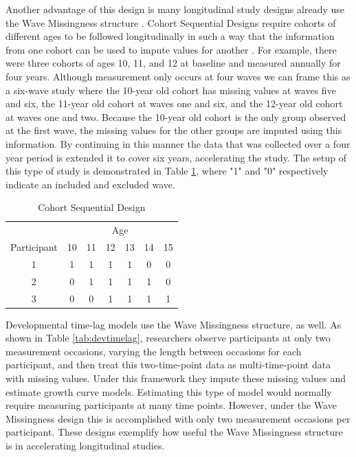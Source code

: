 \documentclass{svjour3}\usepackage[]{graphicx}\usepackage[]{color}
\begin{document}
Another advantage of this design is many longitudinal study designs already use the Wave Missingness structure \citep{little2013planned}. Cohort Sequential Designs require cohorts of different ages to be followed longitudinally in such a way that the information from one cohort can be used to impute values for another \citep{little2013longitudinal, duncan2013introduction}. For example, there were three cohorts of ages 10, 11, and 12 at baseline and measured annually for four years. Although measurement only occurs at four waves we can frame this as a six-wave study where the 10-year old cohort has missing values at waves five and six, the 11-year old cohort at waves one and six, and the 12-year old cohort at waves one and two. Because the 10-year old cohort is the only group observed at the first wave, the missing values for the other groups are imputed using this information. By continuing in this manner the data that was collected over a four year period is extended it to cover six years, accelerating the study. The setup of this type of study is demonstrated in Table \ref{tab:cohort}, where "1" and "0" respectively indicate an included and excluded wave. \par

\begin{table}[H]
	\centering
	\caption{Cohort Sequential Design}
	\label{tab:cohort}
	\setlength{\tabcolsep}{0.5cm}
	\begin{tabular}{c|cccccc}
		\toprule
		& \multicolumn{6}{c}{Age} \\
		Participant & 10 & 11 & 12 & 13 & 14 & 15 \\
		\midrule
		1 & 1 & 1 & 1 & 1 & 0 & 0\\
		2 & 0 & 1 & 1 & 1 & 1 & 0\\
		3 & 0 & 0 & 1 & 1 & 1 & 1\\
		\bottomrule
	\end{tabular}
\end{table}

Developmental time-lag models \citep{mcardle1997expanding} use the Wave Missingness structure, as well. As shown in Table \ref{tab:devtimelag}, researchers observe participants at only two measurement occasions, varying the length between occasions for each participant, and then treat this two-time-point data as multi-time-point data with missing values. Under this framework they impute these missing values and estimate growth curve models. Estimating this type of model would normally require measuring participants at many time points. However, under the Wave Missingness design this is accomplished with only two measurement occasions per participant. These designs exemplify how useful the Wave Missingness structure is in accelerating longitudinal studies. \par
\end{document}
